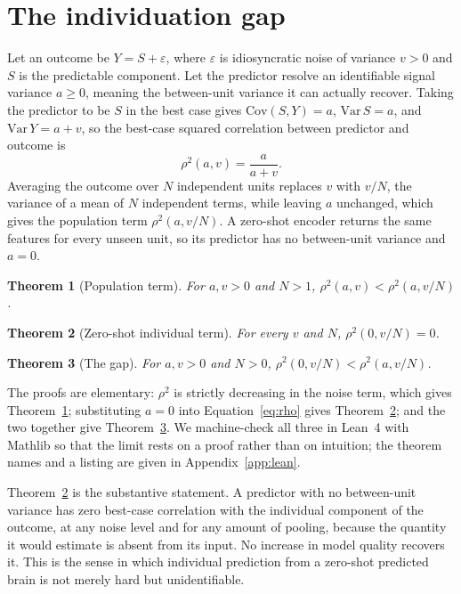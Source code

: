 \documentclass{article}
\newtheorem{theorem}{Theorem}
\begin{document}
\section{The individuation gap}
\label{sec:gap}
Let an outcome be $Y=S+\varepsilon$, where $\varepsilon$ is idiosyncratic noise of variance $v>0$ and $S$ is
the predictable component. Let the predictor resolve an identifiable signal variance $a\ge 0$, meaning the
between-unit variance it can actually recover. Taking the predictor to be $S$ in the best case gives
$\mathrm{Cov}(S,Y)=a$, $\mathrm{Var}\,S=a$, and $\mathrm{Var}\,Y=a+v$, so the best-case squared correlation
between predictor and outcome is
\begin{equation}
\rho^2(a,v)=\frac{a}{a+v}.
\label{eq:rho}
\end{equation}
Averaging the outcome over $N$ independent units replaces $v$ with $v/N$, the variance of a mean of $N$
independent terms, while leaving $a$ unchanged, which gives the population term $\rho^2(a,v/N)$. A zero-shot
encoder returns the same features for every unseen unit, so its predictor has no between-unit variance and
$a=0$.

\begin{theorem}[Population term]\label{thm:agg}
For $a,v>0$ and $N>1$, $\rho^2(a,v)<\rho^2(a,v/N)$.
\end{theorem}
\begin{theorem}[Zero-shot individual term]\label{thm:zero}
For every $v$ and $N$, $\rho^2(0,v/N)=0$.
\end{theorem}
\begin{theorem}[The gap]\label{thm:gap}
For $a,v>0$ and $N>0$, $\rho^2(0,v/N)<\rho^2(a,v/N)$.
\end{theorem}

The proofs are elementary: $\rho^2$ is strictly decreasing in the noise term, which gives
Theorem~\ref{thm:agg}; substituting $a=0$ into Equation~\ref{eq:rho} gives Theorem~\ref{thm:zero}; and the
two together give Theorem~\ref{thm:gap}. We machine-check all three in Lean~4 with Mathlib so that the limit
rests on a proof rather than on intuition; the theorem names and a listing are given in
Appendix~\ref{app:lean}.

Theorem~\ref{thm:zero} is the substantive statement. A predictor with no between-unit variance has zero
best-case correlation with the individual component of the outcome, at any noise level and for any amount of
pooling, because the quantity it would estimate is absent from its input. No increase in model quality
recovers it. This is the sense in which individual prediction from a zero-shot predicted brain is not merely
hard but unidentifiable.
\end{document}
